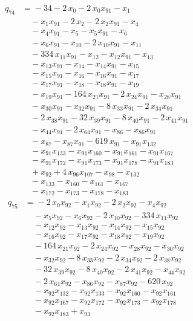 \begin{align*}
q_{74} &={}-34 -2\,x_{0} -2\,x_{0}x_{91} -x_{1}\\
&\quad -x_{1}x_{91} -2\,x_{2} -2\,x_{2}x_{91} -x_{4}\\
&\quad -x_{4}x_{91} -x_{5} -x_{5}x_{91} -x_{6}\\
&\quad -x_{6}x_{91} -x_{10} -2\,x_{10}x_{91} -x_{11}\\
&\quad -334\,x_{11}x_{91} -x_{12} -x_{12}x_{91} -x_{13}\\
&\quad -x_{13}x_{91} -x_{14} -x_{14}x_{91} -x_{15}\\
&\quad -x_{15}x_{91} -x_{16} -x_{16}x_{91} -x_{17}\\
&\quad -x_{17}x_{91} -x_{18} -x_{18}x_{91} -x_{19}\\
&\quad -x_{19}x_{91} -164\,x_{21}x_{91} -2\,x_{24}x_{91} -x_{28}x_{91}\\
&\quad -x_{30}x_{91} -x_{32}x_{91} -8\,x_{33}x_{91} -2\,x_{34}x_{91}\\
&\quad -2\,x_{38}x_{91} -32\,x_{39}x_{91} -8\,x_{40}x_{91} -2\,x_{41}x_{91}\\
&\quad -x_{44}x_{91} -2\,x_{64}x_{91} -x_{86} -x_{86}x_{91}\\
&\quad -x_{87} -x_{87}x_{91} -619\,x_{91} -x_{91}x_{132}\\
&\quad -x_{91}x_{133} -x_{91}x_{160} -x_{91}x_{161} -x_{91}x_{167}\\
&\quad -x_{91}x_{172} -x_{91}x_{173} -x_{91}x_{178} -x_{91}x_{183}\\
&\quad +x_{92} +4\,x_{96}x_{107} -x_{98} -x_{132}\\
&\quad -x_{133} -x_{160} -x_{161} -x_{167}\\
&\quad -x_{172} -x_{173} -x_{178} -x_{183}
\end{align*}
\begin{align*}
q_{75} &={}-2\,x_{0}x_{92} -x_{1}x_{92} -2\,x_{2}x_{92} -x_{4}x_{92}\\
&\quad -x_{5}x_{92} -x_{6}x_{92} -2\,x_{10}x_{92} -334\,x_{11}x_{92}\\
&\quad -x_{12}x_{92} -x_{13}x_{92} -x_{14}x_{92} -x_{15}x_{92}\\
&\quad -x_{16}x_{92} -x_{17}x_{92} -x_{18}x_{92} -x_{19}x_{92}\\
&\quad -164\,x_{21}x_{92} -2\,x_{24}x_{92} -x_{28}x_{92} -x_{30}x_{92}\\
&\quad -x_{32}x_{92} -8\,x_{33}x_{92} -2\,x_{34}x_{92} -2\,x_{38}x_{92}\\
&\quad -32\,x_{39}x_{92} -8\,x_{40}x_{92} -2\,x_{41}x_{92} -x_{44}x_{92}\\
&\quad -2\,x_{64}x_{92} -x_{86}x_{92} -x_{87}x_{92} -620\,x_{92}\\
&\quad -x_{92}x_{132} -x_{92}x_{133} -x_{92}x_{160} -x_{92}x_{161}\\
&\quad -x_{92}x_{167} -x_{92}x_{172} -x_{92}x_{173} -x_{92}x_{178}\\
&\quad -x_{92}x_{183} +x_{93}
\end{align*}
